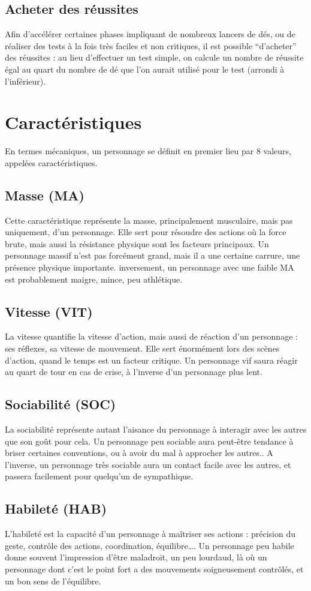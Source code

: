 \documentclass[10pt,a4paper,twocolumn]{book}
\begin{document}
\subsection{Acheter des réussites}
Afin d’accélérer certaines phases impliquant de nombreux lancers de dés, ou de réaliser des tests à la fois très faciles et non critiques, il est possible “d’acheter” des réussites : au lieu d’effectuer un test simple, on calcule un nombre de réussite égal au quart du nombre de dé que l’on aurait utilisé pour le test (arrondi à l’inférieur).

\section{Caractéristiques}
En termes mécaniques, un personnage se définit en premier lieu par 8 valeurs, appelées caractéristiques.
\subsection{Masse (MA)}
Cette caractéristique représente la masse, principalement musculaire, mais pas uniquement, d’un personnage. Elle sert pour résoudre des actions où la force brute, mais aussi la résistance physique sont les facteurs principaux.
Un personnage massif n’est pas forcément grand, mais il a une certaine carrure, une présence physique importante.
inversement, un personnage avec une faible MA est probablement maigre, mince, peu athlétique.
\subsection{Vitesse (VIT)}
La vitesse quantifie la vitesse d’action, mais aussi de réaction d’un personnage : ses réflexes, sa vitesse de mouvement. Elle sert énormément lors des scènes d’action, quand le temps est un facteur critique.
Un personnage vif saura réagir au quart de tour en cas de crise, à l’inverse d’un personnage plus lent.
\subsection{Sociabilité (SOC)}
La sociabilité représente autant  l’aisance du personnage à interagir avec les autres que son goût pour cela.
Un personnage peu sociable aura peut-être tendance à briser certaines conventions, ou à avoir du mal à approcher les autres.. A l’inverse, un personnage très sociable aura un contact facile avec les autres, et passera facilement pour quelqu’un de sympathique.
\subsection{Habileté (HAB)}
L’habileté est la capacité d’un personnage à maîtriser ses actions : précision du geste, contrôle des actions, coordination, équilibre….
Un personnage peu habile donne souvent l’impression d’être maladroit, un peu lourdaud, là où un personnage dont c’est le point fort a des mouvements soigneusement contrôlés, et un bon sens de l’équilibre.
\end{document}
